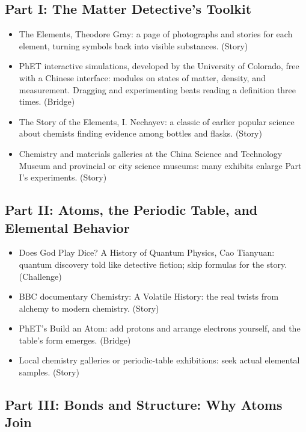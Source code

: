 \subsection*{Part I: The Matter Detective's Toolkit}

\begin{itemize}[itemsep=2pt]
\item The Elements, Theodore Gray: a page of photographs and stories for each element, turning symbols back into visible substances. (Story)
\item PhET interactive simulations, developed by the University of Colorado, free with a Chinese interface: modules on states of matter, density, and measurement. Dragging and experimenting beats reading a definition three times. (Bridge)
\item The Story of the Elements, I. Nechayev: a classic of earlier popular science about chemists finding evidence among bottles and flasks. (Story)
\item Chemistry and materials galleries at the China Science and Technology Museum and provincial or city science museums: many exhibits enlarge Part I's experiments. (Story)
\end{itemize}

\subsection*{Part II: Atoms, the Periodic Table, and Elemental Behavior}

\begin{itemize}[itemsep=2pt]
\item Does God Play Dice? A History of Quantum Physics, Cao Tianyuan: quantum discovery told like detective fiction; skip formulas for the story. (Challenge)
\item BBC documentary Chemistry: A Volatile History: the real twists from alchemy to modern chemistry. (Story)
\item PhET's Build an Atom: add protons and arrange electrons yourself, and the table's form emerges. (Bridge)
\item Local chemistry galleries or periodic-table exhibitions: seek actual elemental samples. (Story)
\end{itemize}

\subsection*{Part III: Bonds and Structure: Why Atoms Join}

